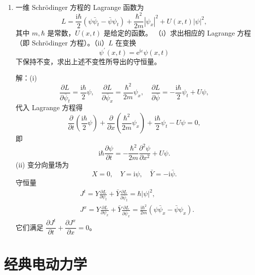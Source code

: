 \begin{enumerate}
\item 一维 Schrödinger 方程的 Lagrange 函数为
$$L=\frac{\mathrm{i} \hbar}{2}(\psi \bar{\psi}_t-\bar{\psi} \psi_t)
+\frac{\hbar^2}{2m}|\psi_x|^2+U(x, t)|\psi|^2,$$
其中 $m, \hbar$ 是常数，$U(x, t)$ 是给定的函数。
（i）求出相应的 Lagrange 方程（即 Schrödinger 方程）。（ii）$L$ 在变换
$$\psi^{\prime}(x, t)=\mathrm{e}^{\mathrm{i} \varepsilon} \psi(x, t)$$
下保持不变，求出上述不变性所导出的守恒量。

解：(i)
$$\frac{\partial L}{\partial \bar{\psi}_{t}}=\frac{\mathrm{i}\hbar}{2}\psi, 
\quad \frac{\partial L}{\partial \bar{\psi}_{x}}=\frac{\hbar^{2}}{2m}\psi_{x}, 
\quad \frac{\partial L}{\partial \bar{\psi}}=-\frac{\mathrm{i}\hbar}{2}\psi_{t}+U\psi,$$
代入 Lagrange 方程得
$$\frac{\partial}{\partial t}\left(\frac{\mathrm{i}\hbar}{2}\psi\right)
+\frac{\partial}{\partial x}\left(\frac{\hbar^{2}}{2m}\psi_{x}\right)
+\frac{\mathrm{i}\hbar}{2}\psi_{t}-U\psi=0,$$
即
$$\mathrm{i} \hbar \frac{\partial \psi}{\partial t}
=-\frac{\hbar^{2}}{2m}\frac{\partial^{2} \psi}{\partial x^{2}}+U\psi.$$
(ii) 变分向量场为
$$X=0, \quad Y=\mathrm{i}\psi, \quad \bar{Y}=-\mathrm{i}\bar{\psi}.$$
守恒量
\begin{align*}
& J^{t}=Y\frac{\partial L}{\partial \psi_{t}}+\bar{Y}\frac{\partial L}{\partial \bar{\psi}_{t}}=\hbar|\psi|^{2}, \\
& J^{x}=Y\frac{\partial L}{\partial \psi_{x}}+\bar{Y}\frac{\partial L}{\partial \bar{\psi}_{x}}
=\frac{\mathrm{i}\hbar^{2}}{2m}(\psi\bar{\psi}_{x}-\bar{\psi}\psi_{x}).
\end{align*}
它们满足 $\dfrac{\partial J^{t}}{\partial t}+\dfrac{\partial J^{x}}{\partial x}=0$。
\end{enumerate}

\section{经典电动力学}


